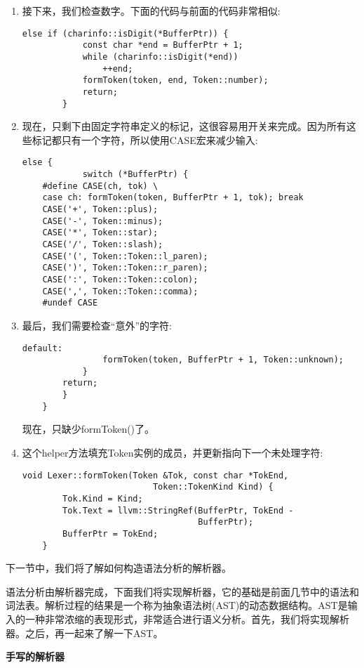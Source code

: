 \begin{enumerate}
	\item 接下来，我们检查数字。下面的代码与前面的代码非常相似:
	\begin{lstlisting}[caption={}]
		else if (charinfo::isDigit(*BufferPtr)) {
			const char *end = BufferPtr + 1;
			while (charinfo::isDigit(*end))
				++end;
			formToken(token, end, Token::number);
			return;
		}
	\end{lstlisting}

	\item 现在，只剩下由固定字符串定义的标记，这很容易用开关来完成。因为所有这些标记都只有一个字符，所以使用CASE宏来减少输入:
	\begin{lstlisting}[caption={}]
		else {
			switch (*BufferPtr) {
	#define CASE(ch, tok) \
	case ch: formToken(token, BufferPtr + 1, tok); break
	CASE('+', Token::plus);
	CASE('-', Token::minus);
	CASE('*', Token::star);
	CASE('/', Token::slash);
	CASE('(', Token::Token::l_paren);
	CASE(')', Token::Token::r_paren);
	CASE(':', Token::Token::colon);
	CASE(',', Token::Token::comma);
	#undef CASE
	\end{lstlisting}

	\item 最后，我们需要检查“意外”的字符:
	\begin{lstlisting}[caption={}]
			default:
				formToken(token, BufferPtr + 1, Token::unknown);
			}
		return;
		}
	}
	\end{lstlisting}
	现在，只缺少formToken()了。

	\item 这个helper方法填充Token实例的成员，并更新指向下一个未处理字符:
	\begin{lstlisting}[caption={}]
	void Lexer::formToken(Token &Tok, const char *TokEnd,
	                      Token::TokenKind Kind) {
		Tok.Kind = Kind;
		Tok.Text = llvm::StringRef(BufferPtr, TokEnd -
								   BufferPtr);
		BufferPtr = TokEnd;
	}
	\end{lstlisting}
\end{enumerate}

下一节中，我们将了解如何构造语法分析的解析器。\par

语法分析由解析器完成，下面我们将实现解析器，它的基础是前面几节中的语法和词法表。解析过程的结果是一个称为抽象语法树(AST)的动态数据结构。AST是输入的一种非常浓缩的表现形式，非常适合进行语义分析。首先，我们将实现解析器。之后，再一起来了解一下AST。\par


\hspace*{\fill} \par %
\textbf{手写的解析器}


